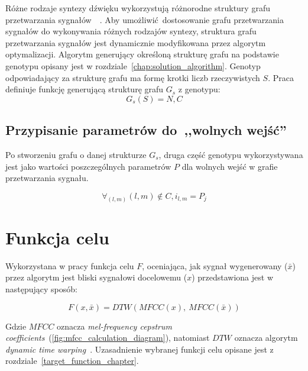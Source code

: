 Różne rodzaje syntezy dźwięku wykorzystują różnorodne struktury grafu przetwarzania
sygnałów~\cite{minilogue_diagram}~\cite{digitone_manual}.
Aby umożliwić dostosowanie grafu przetwarzania sygnałów do wykonywania różnych
rodzajów syntezy, struktura grafu przetwarzania sygnałów jest dynamicznie
modyfikowana przez algorytm optymalizacji. Algorytm generujący określoną
strukturę grafu na podstawie genotypu opisany jest w rozdziale~\ref{chap:solution_algorithm}.
Genotyp odpowiadający za strukturę grafu ma formę krotki liczb rzeczywistych $S$.
Praca definiuje funkcję generującą strukturę grafu $G_s$ z genotypu:
\begin{equation}
  G_s(S) = N, C
  \label{eq:graph_structure_generation_function}
\end{equation}

\subsection{Przypisanie parametrów do~,,wolnych wejść''}\label{sec:graph_params_definition}

Po stworzeniu grafu o danej strukturze $G_s$, druga część genotypu wykorzystywana
jest jako wartości poszczególnych parametrów $P$ dla wolnych wejść w grafie przetwarzania
sygnału.

\begin{equation}
  \forall_{(l,m)} (l, m) \notin C, i_{l,m} = P_j
  \label{eq:graph_params_assignment}
\end{equation}

\section{Funkcja celu}

Wykorzystana w pracy funkcja celu $F$, oceniająca, jak sygnał wygenerowany ($\bar{x}$) przez algorytm
jest bliski sygnałowi docelowemu ($x$) przedstawiona jest w następujący sposób:

\begin{equation}
  F(x, \bar{x}) = DTW(MFCC(x),~MFCC(\bar{x}))
  \label{eq:target_function}
\end{equation}

\noindent
Gdzie $MFCC$ oznacza \textit{mel-frequency cepstrum coefficients}~(\ref{fig:mfcc_calculation_diagram}),
natomiast $DTW$ oznacza algorytm \textit{dynamic time warping}~\cite{mfcc_dtw}.
Uzasadnienie wybranej funkcji celu opisane jest z rozdziale~\ref{target_function_chapter}.


